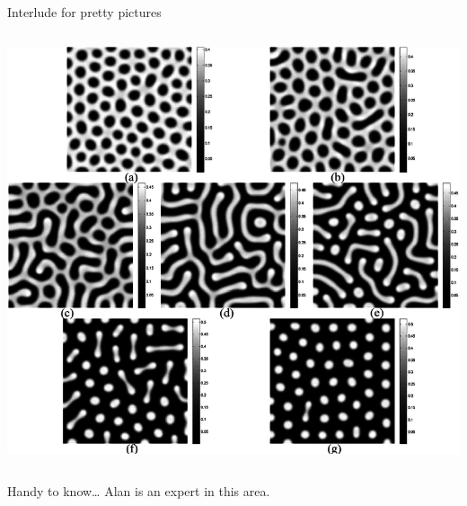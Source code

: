 \documentclass[presentation]{beamer}
\begin{document}
\begin{frame}[label={sec:orgd7db8ae}]{Interlude for pretty pictures}
\begin{columns}
\begin{column}{0.5\columnwidth}
\begin{center}
\includegraphics[width=.9\linewidth]{./turingpatterns.png}
\end{center}
\end{column}
\end{columns}
\end{frame}

\begin{frame}[label={sec:org363b05a}]{Handy to know\ldots{}}
Alan is an expert in this area.
\end{frame}
\end{document}
